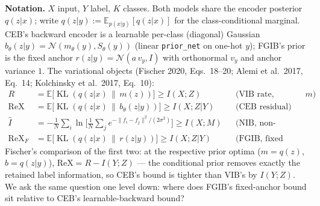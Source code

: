 
\newtheorem{lemma}{Lemma}
\newtheorem{proposition}{Proposition}
\newtheorem{remark}{Remark}

\textbf{Notation.}
$X$ input, $Y$ label, $K$ classes.
Both models share the encoder posterior $q(z|x)$; write
$q(z|y) := \mathbb{E}_{p(x|y)}[q(z|x)]$ for the class-conditional marginal.
CEB's backward encoder is a learnable per-class (diagonal) Gaussian
$b_\theta(z|y) = \mathcal{N}(m_\theta(y), S_\theta(y))$ (linear \texttt{prior\_net} on
one-hot $y$); FGIB's prior is the fixed anchor $r(z|y) = \mathcal{N}(a\,v_y, I)$ with
orthonormal $v_y$ and anchor variance $1$.
The variational objects (Fischer 2020, Eqs.~18--20; Alemi et al.\ 2017, Eq.~14;
Kolchinsky et al.\ 2017, Eq.~10):
\begin{align*}
R &= \mathbb{E}\big[\operatorname{KL}(q(z|x)\,\|\,m(z))\big] \ge I(X;Z)
&&\text{(VIB rate, marginal prior $m$)} \\
\mathrm{ReX} &= \mathbb{E}\big[\operatorname{KL}(q(z|x)\,\|\,b_\theta(z|y))\big]
\ge I(X;Z|Y)
&&\text{(CEB residual)} \\
\widehat I &= -\frac{1}{N}\sum_i \ln\Big[\frac{1}{N}\sum_j
e^{-\|f_i-f_j\|^2/(2\sigma^2)}\Big] \ge I(X;M)
&&\text{(NIB, non-parametric)} \\
\mathrm{ReX}_F &= \mathbb{E}\big[\operatorname{KL}(q(z|x)\,\|\,r(z|y))\big]
\ge I(X;Z|Y)
&&\text{(FGIB, fixed anchor)}
\end{align*}
Fischer's comparison of the first two: at the respective prior optima
($m = q(z)$, $b = q(z|y)$), $\mathrm{ReX} = R - I(Y;Z)$ --- the conditional prior removes
exactly the retained label information, so CEB's bound is tighter than VIB's by
$I(Y;Z)$. We ask the same question one level down: where does FGIB's fixed-anchor bound
sit relative to CEB's learnable-backward bound?

